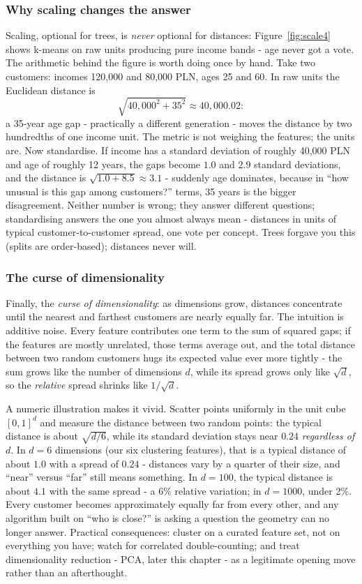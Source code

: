 \documentclass[11pt,a4paper]{article}
\begin{document}
\subsubsection{Why scaling changes the answer}
Scaling, optional for trees, is \emph{never} optional for distances:
Figure~\ref{fig:scale4} shows k-means on raw units producing pure income
bands - age never got a vote. The arithmetic behind the figure is
worth doing once by hand. Take two customers: incomes 120{,}000 and
80{,}000 PLN, ages 25 and 60. In raw units the Euclidean distance is
\[
  \sqrt{40{,}000^2 + 35^2} \approx 40{,}000.02 :
\]
a 35-year age gap - practically a different generation - moves the
distance by two hundredths of one income unit. The metric is not
weighing the features; the units are. Now standardise. If income has a
standard deviation of roughly 40{,}000 PLN and age of roughly 12 years,
the gaps become $1.0$ and $2.9$ standard deviations, and the distance is
$\sqrt{1.0 + 8.5} \approx 3.1$ - suddenly age dominates, because in
``how unusual is this gap among customers?'' terms, 35 years is the
bigger disagreement. Neither number is wrong; they answer different
questions; standardising answers the one you almost always mean -
distances in units of typical customer-to-customer spread, one vote per
concept. Trees forgave you this (splits are order-based); distances
never will.

\subsubsection{The curse of dimensionality}
Finally, the \emph{curse of dimensionality}: as dimensions grow,
distances concentrate until the nearest and farthest customers are
nearly equally far. The intuition is additive noise. Every feature
contributes one term to the sum of squared gaps; if the features are
mostly unrelated, those terms average out, and the total distance
between two random customers hugs its expected value ever more tightly
- the sum grows like the number of dimensions $d$, while its spread
grows only like $\sqrt{d}$, so the \emph{relative} spread shrinks like
$1/\sqrt{d}$.

A numeric illustration makes it vivid. Scatter points uniformly in the
unit cube $[0,1]^d$ and measure the distance between two random points:
the typical distance is about $\sqrt{d/6}$, while its standard deviation
stays near $0.24$ \emph{regardless of} $d$. In $d = 6$ dimensions (our
six clustering features), that is a typical distance of about $1.0$
with a spread of $0.24$ - distances vary by a quarter of their size,
and ``near'' versus ``far'' still means something. In $d = 100$, the
typical distance is about $4.1$ with the same spread - a 6\% relative
variation; in $d = 1000$, under 2\%. Every customer becomes
approximately equally far from every other, and any algorithm built on
``who is close?'' is asking a question the geometry can no longer
answer. Practical consequences: cluster on a curated feature set, not on
everything you have; watch for correlated double-counting; and treat
dimensionality reduction - PCA, later this chapter - as a legitimate
opening move rather than an afterthought.
\end{document}
